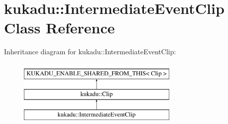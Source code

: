 \hypertarget{classkukadu_1_1IntermediateEventClip}{\section{kukadu\-:\-:Intermediate\-Event\-Clip Class Reference}
\label{classkukadu_1_1IntermediateEventClip}
}
Inheritance diagram for kukadu\-:\-:Intermediate\-Event\-Clip\-:\begin{figure}[H]
\begin{center}
\leavevmode
\includegraphics[height=3.000000cm]{classkukadu_1_1IntermediateEventClip}
\end{center}
\end{figure}
